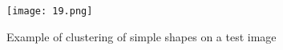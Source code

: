 
      \begin{figure}[hb!]
        \centering
        \texttt{[image: 19.png]} 
        \caption{Example of clustering of simple shapes on a test image}
        \label{clusteringEx}
      \end{figure}




\clearpage